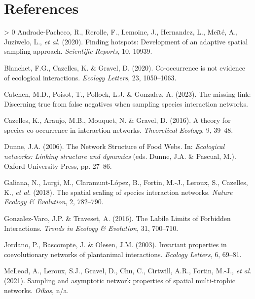 \documentclass[10pt,oneside]{article}
\newlength{\cslhangindent}
\newenvironment{CSLReferences}[3] %
 {%
  \setlength{\parindent}{0pt}
  \ifodd #1 \everypar{\setlength{\hangindent}{\cslhangindent}}\ignorespaces\fi
  \ifnum #2 > 0
  \setlength{\parskip}{#2\baselineskip}
  \fi
 }%
 {}
\begin{document}
\hypertarget{references}{%
\section*{References}\label{references}}

\hypertarget{refs}{}
\begin{CSLReferences}{1}{0}
\leavevmode\hypertarget{ref-Andrade-Pacheco2020Finding}{}%
Andrade-Pacheco, R., Rerolle, F., Lemoine, J., Hernandez, L., Meïté, A.,
Juziwelo, L., \emph{et al.} (2020). Finding hotspots: Development of an
adaptive spatial sampling approach. \emph{Scientific Reports}, 10,
10939.

\leavevmode\hypertarget{ref-Blanchet2020Cooccurrencea}{}%
Blanchet, F.G., Cazelles, K. \& Gravel, D. (2020). Co-occurrence is not
evidence of ecological interactions. \emph{Ecology Letters}, 23,
1050--1063.

\leavevmode\hypertarget{ref-Catchen2023Missinga}{}%
Catchen, M.D., Poisot, T., Pollock, L.J. \& Gonzalez, A. (2023). The
missing link: Discerning true from false negatives when sampling species
interaction networks.

\leavevmode\hypertarget{ref-Cazelles2016Theorya}{}%
Cazelles, K., Araujo, M.B., Mouquet, N. \& Gravel, D. (2016). A theory
for species co-occurrence in interaction networks. \emph{Theoretical
Ecology}, 9, 39--48.

\leavevmode\hypertarget{ref-Dunne2006Network}{}%
Dunne, J.A. (2006). The Network Structure of Food Webs. In:
\emph{Ecological networks: Linking structure and dynamics} (eds. Dunne,
J.A. \& Pascual, M.). Oxford University Press, pp. 27--86.

\leavevmode\hypertarget{ref-Galiana2018SpaSca}{}%
Galiana, N., Lurgi, M., Claramunt-López, B., Fortin, M.-J., Leroux, S.,
Cazelles, K., \emph{et al.} (2018). The spatial scaling of species
interaction networks. \emph{Nature Ecology \& Evolution}, 2, 782--790.

\leavevmode\hypertarget{ref-Gonzalez-Varo2016Labilea}{}%
Gonzalez-Varo, J.P. \& Traveset, A. (2016). The Labile Limits of
Forbidden Interactions. \emph{Trends in Ecology \& Evolution}, 31,
700--710.

\leavevmode\hypertarget{ref-Jordano2003Invarianta}{}%
Jordano, P., Bascompte, J. \& Olesen, J.M. (2003). Invariant properties
in coevolutionary networks of plantanimal interactions. \emph{Ecology
Letters}, 6, 69--81.

\leavevmode\hypertarget{ref-McLeod2021Sampling}{}%
McLeod, A., Leroux, S.J., Gravel, D., Chu, C., Cirtwill, A.R., Fortin,
M.-J., \emph{et al.} (2021). Sampling and asymptotic network properties
of spatial multi-trophic networks. \emph{Oikos}, n/a.


\end{CSLReferences}
\end{document}
